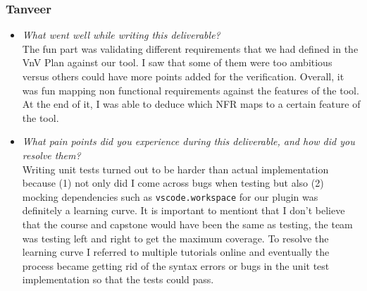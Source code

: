 \documentclass[12pt, titlepage]{article}
\begin{document}
\subsubsection*{Tanveer}
\begin{itemize}
  \item \textit{What went well while writing this deliverable?} \\

    The fun part was validating different requirements that we had
    defined in the VnV Plan against our tool. I saw that some of them
    were too ambitious versus others could have more points added for
    the verification. Overall, it was fun mapping non functional
    requirements against the features of the tool. At the end of it,
    I was able to deduce which NFR maps to a certain feature of the tool.

  \item \textit{What pain points did you experience during this
    deliverable, and how did you resolve them?}\\

    Writing unit tests turned out to be harder than actual
    implementation because (1) not only did I come across bugs when
    testing but also (2) mocking dependencies such as
    \texttt{vscode.workspace} for our plugin was definitely a
    learning curve. It is important to mentiont that I don't believe
    that the course and capstone would have been the same as testing,
    the team was testing left and right to get the maximum coverage.
    To resolve the learning curve I referred to multiple tutorials
    online and eventually the process became getting rid of the
    syntax errors or bugs in the unit test implementation so that the
    tests could pass.
\end{itemize}
\end{document}
